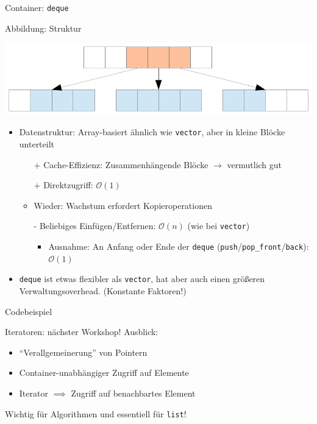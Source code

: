 \begin{frame}[fragile]{Container: \texttt{deque}}
	\begin{block}{Abbildung: Struktur}
		\begin{center}
			\includegraphics[width=0.6\linewidth]{images/deque.pdf}
		\end{center}
	\end{block}
	
	\begin{itemize}
		\item Datenstruktur: Array-basiert ähnlich wie \verb|vector|, aber in kleine Blöcke unterteilt
		\pause
		\begin{itemize}
			\item[+] Cache-Effizienz: Zusammenhängende Blöcke $\rightarrow$ vermutlich gut
			\item[+] Direktzugriff: $\mathcal{O}(1)$
			\pause
			\item Wieder: Wachstum erfordert Kopieroperationen
			\item[-] Beliebiges Einfügen/Entfernen: $\mathcal{O}(n)$ (wie bei \verb|vector|)
			\begin{itemize}
				\item Ausnahme: An Anfang oder Ende der \verb|deque| (\verb|push|/\verb|pop_front|/\verb|back|): $\mathcal{O}(1)$
			\end{itemize}
		\end{itemize}
		\pause
		\item \verb|deque| ist etwas flexibler als \verb|vector|, hat aber auch einen größeren Verwaltungsoverhead. (Konstante Faktoren!)
	\end{itemize}
\end{frame}

\begin{frame}{Codebeispiel}
	
\end{frame}

\begin{frame}[fragile]{Iteratoren: nächster Workshop!}
	Ausblick:
	\begin{itemize}
		\item \enquote{Verallgemeinerung} von Pointern
		\item Container-unabhängiger Zugriff auf Elemente
		\item Iterator $\implies$ Zugriff auf benachbartes Element
	\end{itemize}
	
	\vspace{2em}
	
	Wichtig für Algorithmen und essentiell für \verb|list|!
\end{frame}

